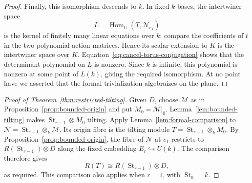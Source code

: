 \begin{proof}
Finally, this isomorphism descends to $k$.  In fixed $k$-bases, the
intertwiner space
\[
 L=\operatorname{Hom}_U(T,\mathcal N_{e_1})
\]
is the kernel of finitely many linear equations over $k$: compare the
coefficients of $t$ in the two polynomial action matrices.  Hence its
scalar extension to $K$ is the intertwiner space over $K$.
Equation~\eqref{eq:cancel-torus-conjugation} shows that the determinant
polynomial on $L$ is nonzero.  Since $k$ is infinite, this polynomial is
nonzero at some point of $L(k)$, giving the required isomorphism.  At no
point have we asserted that the formal trivialization algebraizes on
the plane.
\end{proof}

\begin{proof}[Proof of Theorem~\ref{thm:restricted-tilting}]
Given $D$, choose $\mathcal M$ as in Proposition~\ref{prop:bounded-origin}
and put $M_0=\mathcal M|_0$. Lemma~\ref{lem:bounded-tilting} makes
$\operatorname{St}_{r-1}\otimes M_0$ tilting. Apply Lemma~\ref{lem:formal-comparison} to
$\mathcal N=\operatorname{St}_{r-1}\otimes_k\mathcal M$.  Its origin
fibre is the tilting module
$T=\operatorname{St}_{r-1}\otimes_kM_0$.  By
Proposition~\ref{prop:bounded-origin}, the fibre of $\mathcal N$ at $e_1$
restricts to $R(\operatorname{St}_{r-1})\otimes D$ along the fixed
embedding $E_r\hookrightarrow U(k)$.  The comparison therefore gives
\[
 R(T)\cong R(\operatorname{St}_{r-1})\otimes D,
\]
as required.  This comparison also applies when $r=1$, with
$\operatorname{St}_0=k$.
\end{proof}
